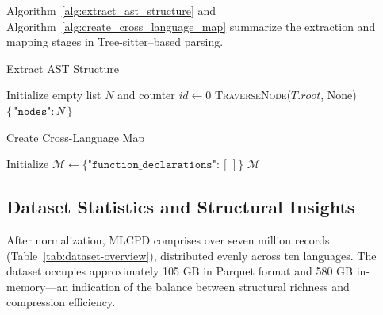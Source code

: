 \documentclass{article}
\begin{document}
Algorithm~\ref{alg:extract_ast_structure} and Algorithm~\ref{alg:create_cross_language_map} summarize the extraction and mapping stages in Tree-sitter–based parsing.

\begin{algorithm}[H]
\caption{Extract AST Structure}
\label{alg:extract_ast_structure}
\DontPrintSemicolon
{}
Initialize empty list $N$ and counter $id \leftarrow 0$\;
\textsc{TraverseNode}($T.root$, None)\;
\Return $\{\,\texttt{"nodes"}: N\,\}$\;
\end{algorithm}

\begin{algorithm}[H]
\caption{Create Cross-Language Map}
\label{alg:create_cross_language_map}
\DontPrintSemicolon
{}
Initialize $\mathcal{M} \gets \{\texttt{"function\_declarations"} : [\,]\}$\;
\Return $\mathcal{M}$\;
\end{algorithm}

\subsection{Dataset Statistics and Structural Insights}
After normalization, MLCPD comprises over seven million records (Table~\ref{tab:dataset-overview}), distributed evenly across ten languages. The dataset occupies approximately 105 GB in Parquet format and 580 GB in-memory—an indication of the balance between structural richness and compression efficiency.  
\end{document}
